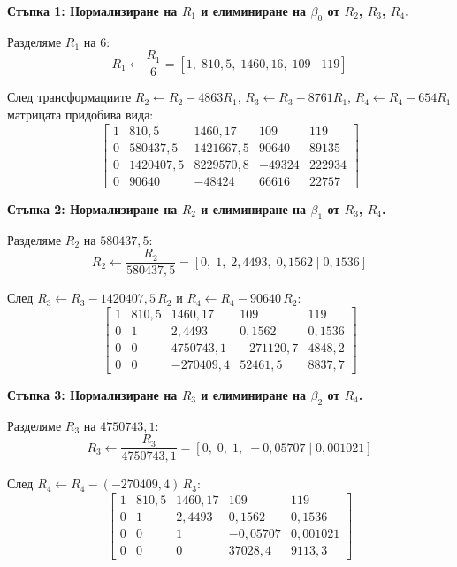 \textbf{Стъпка 1: Нормализиране на $R_1$ и елиминиране на $\beta_0$ от $R_2$, $R_3$, $R_4$.}

Разделяме $R_1$ на 6:
\[
R_1 \leftarrow \frac{R_1}{6} = [1,\; 810{,}5,\; 1460{,}1\overline{6},\; 109 \mid 119]
\]

След трансформациите $R_2 \leftarrow R_2 - 4863 R_1$,\; $R_3 \leftarrow R_3 - 8761 R_1$,\; $R_4 \leftarrow R_4 - 654 R_1$ матрицата придобива вида:
\[
\left[\begin{array}{cccc|c}
1      & 810{,}5     & 1460{,}17  & 109       & 119      \\
0      & 580437{,}5  & 1421667{,}5 & 90640     & 89135    \\
0      & 1420407{,}5 & 8229570{,}8 & -49324    & 222934   \\
0      & 90640       & -48424      & 66616     & 22757
\end{array}\right]
\]

\textbf{Стъпка 2: Нормализиране на $R_2$ и елиминиране на $\beta_1$ от $R_3$, $R_4$.}

Разделяме $R_2$ на $580437{,}5$:
\[
R_2 \leftarrow \frac{R_2}{580437{,}5} = [0,\; 1,\; 2{,}4493,\; 0{,}1562 \mid 0{,}1536]
\]

След $R_3 \leftarrow R_3 - 1420407{,}5\, R_2$ и $R_4 \leftarrow R_4 - 90640\, R_2$:
\[
\left[\begin{array}{cccc|c}
1 & 810{,}5 & 1460{,}17  & 109       & 119      \\
0 & 1       & 2{,}4493    & 0{,}1562  & 0{,}1536 \\
0 & 0       & 4750743{,}1 & -271120{,}7 & 4848{,}2 \\
0 & 0       & -270409{,}4 & 52461{,}5 & 8837{,}7
\end{array}\right]
\]

\textbf{Стъпка 3: Нормализиране на $R_3$ и елиминиране на $\beta_2$ от $R_4$.}

Разделяме $R_3$ на $4750743{,}1$:
\[
R_3 \leftarrow \frac{R_3}{4750743{,}1} = [0,\; 0,\; 1,\; -0{,}05707 \mid 0{,}001021]
\]

След $R_4 \leftarrow R_4 - (-270409{,}4)\, R_3$:
\[
\left[\begin{array}{cccc|c}
1 & 810{,}5 & 1460{,}17 & 109        & 119      \\
0 & 1       & 2{,}4493   & 0{,}1562   & 0{,}1536 \\
0 & 0       & 1          & -0{,}05707 & 0{,}001021 \\
0 & 0       & 0          & 37028{,}4  & 9113{,}3
\end{array}\right]
\]

